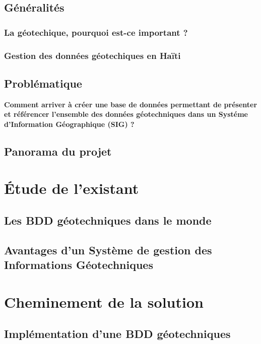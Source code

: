     \subsection{Généralités}
        \subsubsection{La géotechique, pourquoi est-ce important ?}
          
        \subsubsection{Gestion des données géotechiques en Haïti}
            

    \subsection{Problématique}
    \textbf{Comment arriver à créer une base de données permettant de 
    présenter et référencer l'ensemble des données géotechniques dans un Systéme
    d’Information Géographique (SIG) ?}

    \subsection{Panorama du projet}
        

\section{Étude de l'existant}
    \subsection{Les BDD géotechniques dans le monde}
        
    \subsection{Avantages d'un Système de gestion des Informations Géotechniques}
        

\section{Cheminement de la solution}
    \subsection{Implémentation d'une BDD géotechniques}
